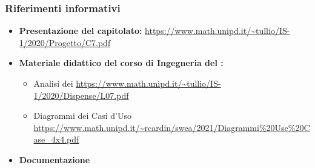 \subsubsection{Riferimenti informativi}
\begin{itemize}
\item \textbf{Presentazione del capitolato:}\newline
      \url{https://www.math.unipd.it/~tullio/IS-1/2020/Progetto/C7.pdf}
\item \textbf{Materiale didattico del corso di Ingegneria del :}
    \begin{itemize}
    \item Analisi dei \newline
      \url{https://www.math.unipd.it/~tullio/IS-1/2020/Dispense/L07.pdf}
    \item Diagrammi dei Casi d'Uso\newline
      \url{https://www.math.unipd.it/~rcardin/swea/2021/Diagrammi\%20Use\%20Case_4x4.pdf}
    \end{itemize}
\item \textbf{Documentazione  }

\end{itemize}